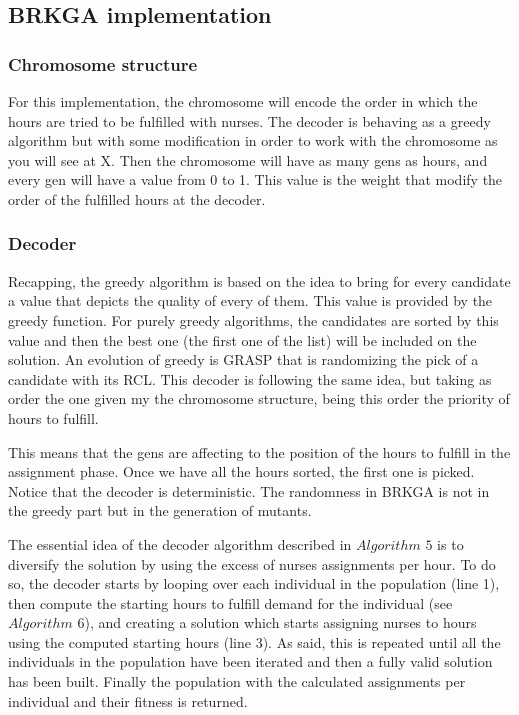 \subsection{BRKGA implementation}

\subsubsection{Chromosome structure}

For this implementation, the chromosome will encode the order in which the hours are tried to be fulfilled with nurses. The decoder is behaving as a greedy algorithm but with some modification in order to work with the chromosome as you will see at X. Then the chromosome will have as many gens as hours, and every gen will have a value from 0 to 1. This value is the weight that modify the order of the fulfilled hours at the decoder.



\subsubsection{Decoder}

Recapping, the greedy algorithm is based on the idea to bring for every candidate a value that depicts the quality of every of them. This value is provided by the greedy function. For purely greedy algorithms, the candidates are sorted by this value and then the best one (the first one of the list) will be included on the solution. An evolution of greedy is GRASP that is randomizing the pick of a candidate with its RCL. This decoder is following the same idea, but taking as order the one given my the chromosome structure, being this order the priority of hours to fulfill.

This means that the gens are affecting to the position of the hours to fulfill in the assignment phase. Once we have all the hours sorted, the first one is picked. Notice that the decoder is deterministic. The randomness in BRKGA is not in the greedy part but in the generation of mutants.

The essential idea of the decoder algorithm described in $Algorithm$ $5$ is to diversify the solution by using the excess of nurses assignments per hour. To do so, the decoder starts by looping over each individual in the population (line 1), then compute the starting hours to fulfill demand for the individual (see $Algorithm$ $6$), and creating a solution which starts assigning nurses to hours using the computed starting hours (line 3). As said, this is repeated until all the individuals in the population have been iterated and then a fully valid solution has been built. Finally the population with the calculated assignments per individual and their fitness is returned.

